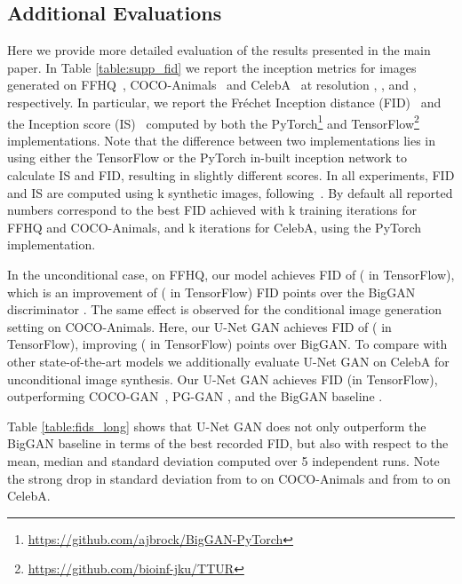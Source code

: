 \documentclass[10pt,twocolumn,letterpaper]{article}
\begin{document}
 \subsection{Additional Evaluations}\label{sec:results}
Here we provide more detailed evaluation of the results presented in the main paper. In Table \ref{table:supp_fid} we report the inception metrics for images generated on FFHQ~\cite{Karras2018ASG}, COCO-Animals~\cite{Lin2014MicrosoftCC,OpenImages} and CelebA~\cite{Liu_Celeba} at resolution , , and , respectively. In particular,
we report the Fr{\'e}chet Inception distance (FID)~\cite{heuselttur2017} and the Inception score (IS)~\cite{SalimansNeurIPS2016} computed by both the PyTorch\footnote{\url{https://github.com/ajbrock/BigGAN-PyTorch}} and TensorFlow\footnote{\url{https://github.com/bioinf-jku/TTUR}} implementations.
Note that the difference between two implementations lies in using either the TensorFlow or the PyTorch in-built inception network to calculate IS and FID, resulting in slightly different scores.
In all experiments, FID and IS are computed using \unit{k} synthetic images, following~\cite{karras2018progressive}.
By default all reported numbers correspond to the best FID achieved with \unit{k} training iterations for FFHQ and COCO-Animals, and \unit{k} iterations for CelebA, using the PyTorch implementation. 

In the unconditional case, on FFHQ, our model achieves FID of  ( in TensorFlow), which is an improvement of  ( in TensorFlow) FID points over the BigGAN discriminator \cite{Brock2019}. 
The same effect is observed for the conditional image generation setting on COCO-Animals. Here, our U-Net GAN achieves FID of  ( in TensorFlow), improving  ( in TensorFlow) points over BigGAN. 
To compare with other state-of-the-art models we additionally evaluate U-Net GAN on CelebA for unconditional image synthesis. Our U-Net GAN achieves  FID (in TensorFlow), outperforming COCO-GAN~\cite{Lin2019COCOGANGB}, PG-GAN \cite{karras2018progressive}, and the BigGAN baseline \cite{Brock2019}. 

Table \ref{table:fids_long} shows that U-Net GAN does not only outperform the BigGAN baseline in terms of the best recorded FID, but also with respect to the mean, median and standard deviation computed over 5 independent runs. Note the strong drop in standard deviation from  to  on COCO-Animals and from  to  on CelebA.
\end{document}
